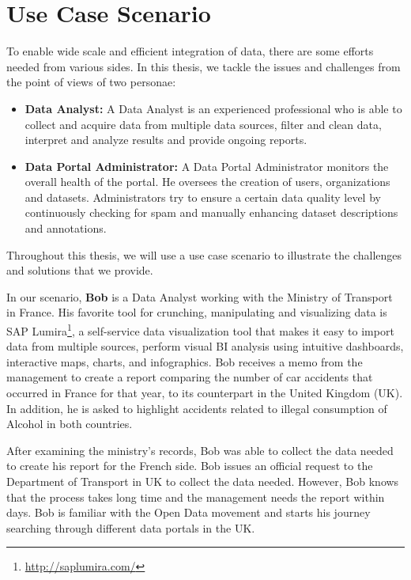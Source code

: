 \section{Use Case Scenario}\label{sec:scenario}

To enable wide scale and efficient integration of data, there are some efforts needed from various sides. In this thesis, we tackle the issues and challenges from the point of views of two personae:

\begin{itemize}
	\item \textbf{Data Analyst:} A Data Analyst is an experienced professional who is able to collect and acquire data from multiple data sources, filter and clean data, interpret and analyze results and provide ongoing reports.
	\item \textbf{Data Portal Administrator:} A Data Portal Administrator monitors the overall health of the portal. He oversees the creation of users, organizations and datasets. Administrators try to ensure a certain data quality level by continuously checking for spam and manually enhancing dataset descriptions and annotations.
\end{itemize}

Throughout this thesis, we will use a use case scenario to illustrate the challenges and solutions that we provide.

In our scenario, \textbf{Bob} is a Data Analyst working with the Ministry of Transport in France. His favorite tool for crunching, manipulating and visualizing data is SAP Lumira\footnote{\url{http://saplumira.com/}}, a self-service data visualization tool that makes it easy to import data from multiple sources, perform visual BI analysis using intuitive dashboards, interactive maps, charts, and infographics. Bob receives a memo from the management to create a report comparing the number of car accidents that occurred in France for that year, to its counterpart in the United Kingdom (UK). In addition, he is asked to highlight accidents related to illegal consumption of Alcohol in both countries.

After examining the ministry's records, Bob was able to collect the data needed to create his report for the French side. Bob issues an official request to the Department of Transport in UK to collect the data needed. However, Bob knows that the process takes long time and the management needs the report within days. Bob is familiar with the Open Data movement and starts his journey searching through different data portals in the UK.

